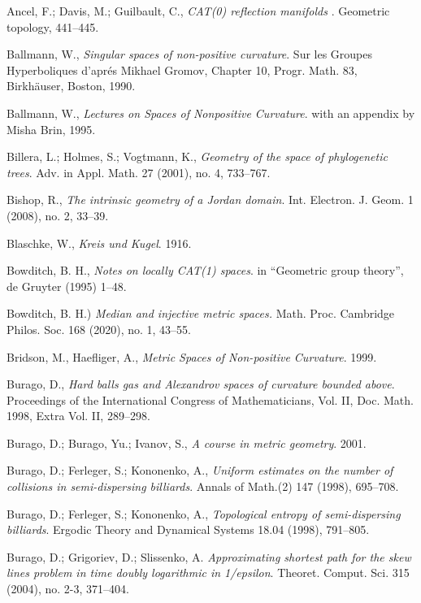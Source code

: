 \begin{thebibliography}{52}
 Ancel, F.; Davis, M.; Guilbault, C.,
\textit{CAT(0) reflection manifolds} .
Geometric topology, 
441--445.

Ballmann, W., 
\textit{Singular spaces of non-positive curvature}. 
Sur les Groupes Hyperboliques d'apr\'{e}s Mikhael Gromov, Chapter 10, Progr. Math. 83, Birkh\"auser, Boston, 1990. 

Ballmann, W., \textit{Lectures on Spaces of Nonpositive Curvature}.
with an appendix by Misha Brin, 1995. 

Billera, L.; 
Holmes, S.; 
Vogtmann, K., 
\textit{Geometry of the space of phylogenetic trees}.
Adv. in Appl. Math. 
27 
(2001), 
no. 4, 
733--767.

Bishop, R., 
\textit{The intrinsic geometry of a Jordan domain}. 
Int. Electron. J. Geom. 
1 
(2008), 
no. 2, 
33--39.

Blaschke, W., 
\textit{Kreis und Kugel}. 1916.

Bowditch, B. H.,
\textit{Notes on locally CAT(1) spaces}.
in ``Geometric group theory'', 
de Gruyter (1995) 1--48.

 Bowditch, B. H.)
\textit{Median and injective metric spaces.}
Math. Proc. Cambridge Philos. Soc. 168 (2020), no. 1, 43--55.

Bridson, M., 
Haefliger, A.,
\textit{Metric Spaces of Non-positive Curvature}. 1999.

Burago, D., 
\textit{Hard balls gas and Alexandrov spaces of curvature bounded above}.
Proceedings of the International Congress of Mathematicians, Vol. II, 
Doc. Math. 1998, 
Extra Vol. II, 
289--298.

Burago, D.; 
Burago, Yu.; 
Ivanov, S., 
\textit{A course in metric geometry}. 2001. 

Burago, D.; 
Ferleger, S.; 
Kononenko, A.,
\textit{Uniform estimates on the number of collisions in semi-dispersing billiards}.
Annals of Math.(2) 147 (1998), 695--708.

Burago, D.; 
Ferleger, S.;
Kononenko, A., 
\textit{Topological entropy of semi-dispersing billiards}.
Ergodic Theory and Dynamical Systems 
18.04 
(1998), 
791--805.

Burago, D.; Grigoriev, D.; Slissenko, A.
\textit{Approximating shortest path for the skew lines problem in time doubly logarithmic in 1/epsilon}. 
Theoret. Comput. Sci. 
315 (2004), 
no. 2-3, 
371--404. 


\end{thebibliography}
